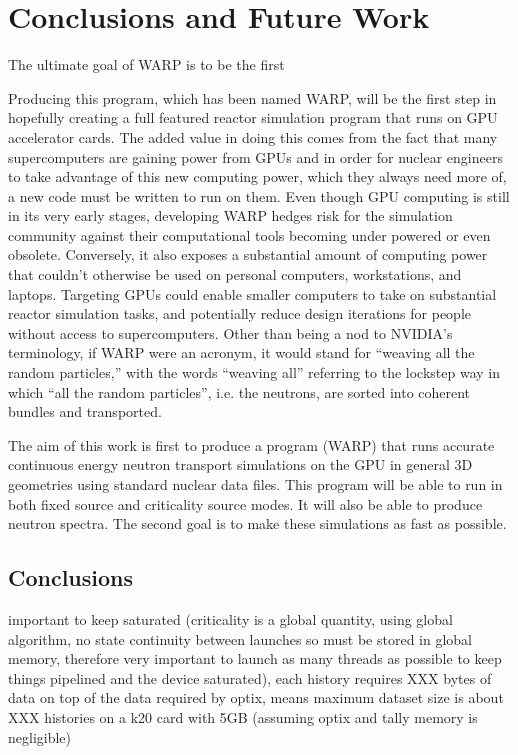 \chapter{Conclusions and Future Work}
\label{chap:conclusions}

The ultimate goal of WARP is to be the first 

Producing this program, which has been named WARP, will be the first step in hopefully creating a full featured reactor simulation program that runs on GPU accelerator cards.  The added value in doing this comes from the fact that many supercomputers are gaining power from GPUs and in order for nuclear engineers to take advantage of this new computing power, which they always need more of, a new code must be written to run on them.  Even though GPU computing is still in its very early stages, developing WARP hedges risk for the simulation community against their computational tools becoming under powered or even obsolete.  Conversely, it also exposes a substantial amount of  computing power that couldn't otherwise be used on personal computers, workstations, and laptops.  Targeting GPUs could enable smaller computers to take on substantial reactor simulation tasks, and potentially reduce design iterations for people without access to supercomputers.  Other than being a nod to NVIDIA's terminology, if WARP were an acronym, it would stand for ``weaving all the random particles,'' with the words ``weaving all'' referring to the lockstep way in which ``all the random particles'', i.e. the neutrons, are sorted into coherent bundles and transported.

The aim of this work is first to produce a program (WARP) that runs accurate continuous energy neutron transport simulations on the GPU in general 3D geometries using standard nuclear data files.  This program will be able to run in both fixed source and criticality source modes.  It will also be able to produce neutron spectra.  The second goal is to make these simulations as fast as possible.

\section{Conclusions}

important to keep saturated (criticality is a global quantity, using global algorithm, no state continuity between launches so must be stored in global memory, therefore very important to launch as many threads as possible to keep things pipelined and the device saturated), each history requires XXX bytes of data on top of the data required by optix, means maximum dataset size is about XXX histories on a k20 card with 5GB (assuming optix and tally memory is negligible)

